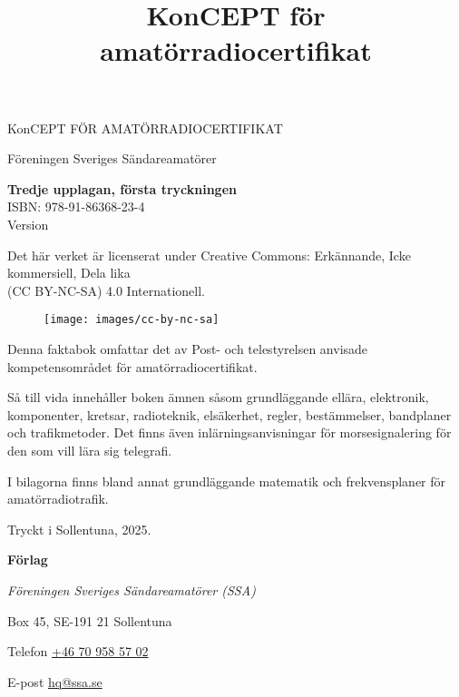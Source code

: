 \onecolumn{}
\vspace{10em}
\title{KonCEPT för amatörradiocertifikat}
\begin{center}
\Large{KonCEPT FÖR AMATÖRRADIOCERTIFIKAT}

Föreningen Sveriges Sändareamatörer\\[2\baselineskip]
\end{center}

\noindent \textbf{Tredje upplagan, första tryckningen}\\
\noindent ISBN: 978-91-86368-23-4\\
\noindent Version \revision
\bigskip

\noindent Det här verket är licenserat under Creative Commons:\newline
\noindent Erkännande, Icke kommersiell, Dela lika\\
\noindent (CC BY-NC-SA) 4.0 Internationell.
\begin{figure}[h]
    \texttt{[image: images/cc-by-nc-sa]}
\end{figure}

\vfill

\noindent Denna faktabok omfattar det av Post- och tele\-styrel\-sen anvisade
kompetensområdet för amatörradiocertifikat.

\bigskip

\noindent Så till vida innehåller boken ämnen såsom grundläggande ellära, elektronik, komponenter,
kretsar, radioteknik, elsäkerhet, regler, bestämmelser, bandplaner och tra\-fik\-metoder.
Det finns även inlärningsanvisningar för morsesignalering för den
som vill lära sig telegrafi.

\bigskip

\noindent I bilagorna finns bland annat grundläggande matematik
och frekvensplaner för ama\-törradiotrafik.

\vfill

\noindent Tryckt i Sollentuna, 2025.

\bigskip

\noindent \textbf{Förlag}

\smallskip

\noindent\textit{Föreningen Sveriges Sändareamatörer (SSA)}

\smallskip\noindent Box 45, SE-191 21 Sollentuna

\smallskip\noindent Telefon \href{tel:+46709585702}{+46 70 958 57 02}

\smallskip\noindent E-post \href{mailto:hq@ssa.se}{hq@ssa.se}

\restoregeometry\twocolumn
{}
